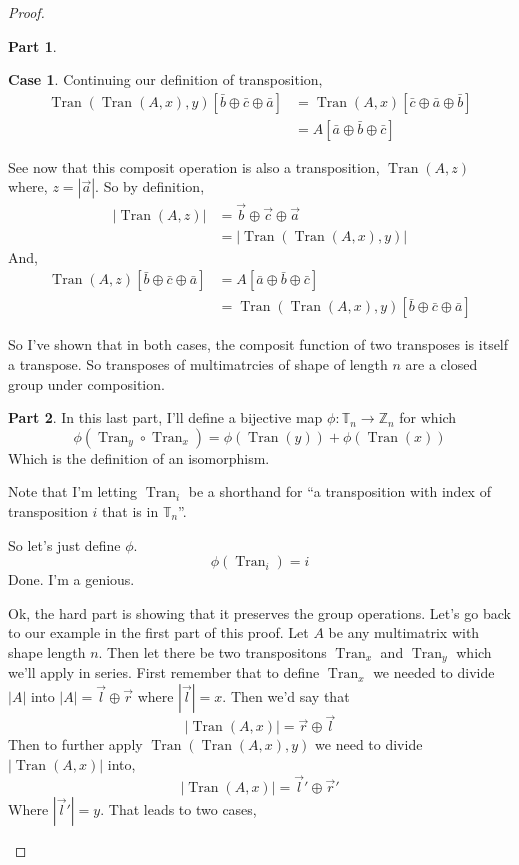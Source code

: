 \documentclass[12pt]{book}
\theoremstyle{plain}
\theoremstyle{definition}
\theoremstyle{ppart}
\newtheorem{ppart}{Part}
\theoremstyle{case}
\newtheorem{case}{Case}
\theoremstyle{solution}
\DeclareMathOperator{\Tran}{Tran}
\newcommand{\shape}[1]{\left|#1\right|}
\begin{document}
\begin{proof}
\begin{ppart}
\begin{case}
Continuing our definition of transposition,
\begin{align*}
  \Tran(\Tran(A, x), y)[\bar{b} \oplus \bar{c} \oplus \bar{a}]
  &=
  \Tran(A, x)[\bar{c} \oplus \bar{a} \oplus \bar{b}] \\
  &=
  A[\bar{a} \oplus \bar{b} \oplus \bar{c}]
\end{align*}

See now that this composit operation is also a transposition, $\Tran(A, z)$ where,
$z = \shape{\vec{a}}$.
So by definition,
\begin{align*}
  \shape{\Tran(A, z)}
  &=
  \vec{b} \oplus \vec{c} \oplus \vec{a} \\
  &=
  \shape{\Tran(\Tran(A, x), y)}  
\end{align*}
And,
\begin{align*}
  \Tran(A, z)[\bar{b} \oplus \bar{c} \oplus \bar{a}]
  &=
  A[\bar{a} \oplus \bar{b} \oplus \bar{c}] \\
  &=
  \Tran(\Tran(A, x), y)[\bar{b} \oplus \bar{c} \oplus \bar{a}]
\end{align*}
\end{case}

So I've shown that in both cases, the composit function of two transposes is
itself a transpose. So transposes of multimatrcies of shape of length $n$ are
a closed group under composition.
\end{ppart}

\begin{ppart}
In this last part, I'll define a bijective map
$\phi: \mathbb{T}_n \to \mathbb{Z}_n$ for which
\[ \phi(\Tran_y \circ \Tran_x) = \phi(\Tran(y)) + \phi(\Tran(x)) \]
Which is the definition of an isomorphism.

Note that I'm letting $\Tran_i$ be a shorthand for ``a transposition
with index of transposition $i$ that is in $\mathbb{T}_n$''.

So let's just define $\phi$.
\[ \phi(\Tran_i) = i \]
Done. I'm a genious.

Ok, the hard part is showing that it preserves the group operations.
Let's go back to our example in the first part of this proof. Let $A$ be
any multimatrix with shape length $n$. Then let there be two transpositons
$\Tran_x$ and $\Tran_y$ which we'll apply in series. First remember that
to define $\Tran_x$ we needed to divide $\shape{A}$ into $\shape{A} = \vec{l} \oplus \vec{r}$
where $\shape{\vec{l}} = x$. Then we'd say that
\[ \shape{\Tran(A, x)} = \vec{r} \oplus \vec{l} \]
Then to further apply $\Tran(\Tran(A, x), y)$ we need to divide $\shape{\Tran(A,x)}$
into,
\[ \shape{\Tran(A, x)} = \vec{l}' \oplus \vec{r}' \]
Where $\shape{\vec{l}'} = y$.
That leads to two cases,


\end{ppart}
\end{proof}
\end{document}
